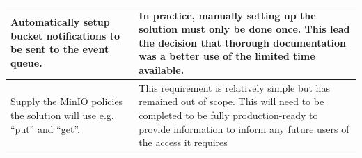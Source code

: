 \documentclass[12pt, conference, final, a4paper, onecolumn, compsoc]{IEEEtran}
\begin{document}
\begin{table}[H]
\begin{tabular}{|p{}|p{}|}
    Automatically setup bucket notifications to be sent to the event queue. & In
    practice, manually setting up the solution must only be done once. This lead
    the decision that thorough documentation was a better use of the limited
                                                                              time
                                                                              available.
    \\ \hline
    Supply the MinIO policies the solution will use e.g. ``put'' and ``get''. &
   This requirement is relatively simple but has remained out of scope. This
                                                                                will
                                                                                need
    to be completed to be fully production-ready to provide information to
                                                                                inform
                                                                                any
                                                                                future
                                                                                users
                                                                                of
                                                                                the
                                                                                access
                                                                                it requires
                                                                              \\ \hline \hline


\end{tabular}
\end{table}
\end{document}
